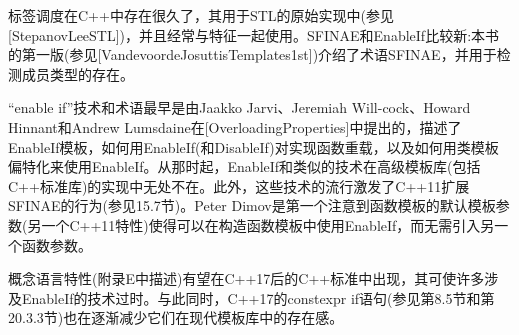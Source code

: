 标签调度在C++中存在很久了，其用于STL的原始实现中(参见[StepanovLeeSTL])，并且经常与特征一起使用。SFINAE和EnableIf比较新:本书的第一版(参见[VandevoordeJosuttisTemplates1st])介绍了术语SFINAE，并用于检测成员类型的存在。

“enable if”技术和术语最早是由Jaakko Jarvi、Jeremiah Will-cock、Howard Hinnant和Andrew Lumsdaine在[OverloadingProperties]中提出的，描述了EnableIf模板，如何用EnableIf(和DisableIf)对实现函数重载，以及如何用类模板偏特化来使用EnableIf。从那时起，EnableIf和类似的技术在高级模板库(包括C++标准库)的实现中无处不在。此外，这些技术的流行激发了C++11扩展SFINAE的行为(参见15.7节)。Peter Dimov是第一个注意到函数模板的默认模板参数(另一个C++11特性)使得可以在构造函数模板中使用EnableIf，而无需引入另一个函数参数。

概念语言特性(附录E中描述)有望在C++17后的C++标准中出现，其可使许多涉及EnableIf的技术过时。与此同时，C++17的constexpr if语句(参见第8.5节和第20.3.3节)也在逐渐减少它们在现代模板库中的存在感。